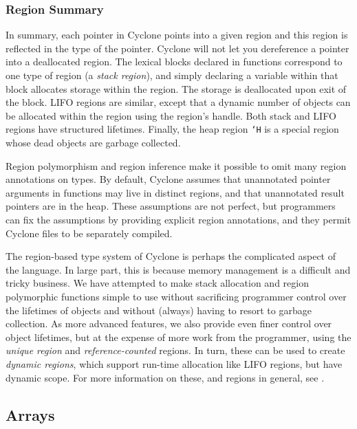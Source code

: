 \subsubsection*{Region Summary}

In summary, each pointer in Cyclone points into a given region
and this region is reflected in the type of the pointer.  Cyclone
will not let you dereference a pointer into a deallocated region.
The lexical blocks declared in functions correspond to one
type of region (a \emph{stack region}), and simply declaring a variable within that
block allocates storage within the region.  The storage is
deallocated upon exit of the block.  LIFO regions are
similar, except that a dynamic number of objects can be allocated
within the region using the region's handle.  Both stack
and LIFO regions have structured lifetimes.  %
Finally, the heap region \texttt{`H} is a
special region whose dead objects are garbage collected.  

Region polymorphism and region inference make it possible to omit many
region annotations on types.  By default, Cyclone assumes that
unannotated pointer arguments in
functions may live in distinct regions, and that unannotated result
pointers are in the heap.  These assumptions are not perfect, but 
programmers can fix the assumptions by providing explicit region
annotations, and they permit Cyclone files to be separately compiled.

The region-based type system of Cyclone is perhaps the
complicated aspect of the language.  In large part, this is
because memory management is a difficult and tricky business.
We have attempted to make stack allocation and region polymorphic
functions simple to use without sacrificing programmer control
over the lifetimes of objects and without (always) having to resort to
garbage collection.  As more advanced features, we also provide
even finer control over object lifetimes, but at the expense of
more work from the programmer, using the \emph{unique region} and
\emph{reference-counted} regions.  In turn, these can be used to
create \emph{dynamic regions}, which support run-time allocation like
LIFO regions, but have dynamic scope.  For more information on these,
and regions in general, see
.

\subsection{Arrays}

